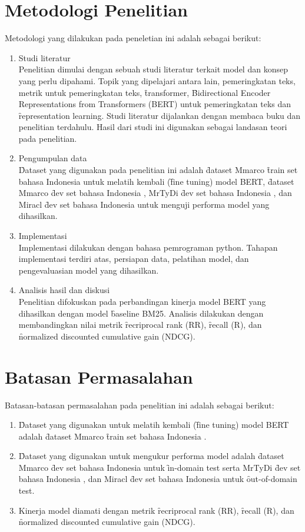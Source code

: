 \section{Metodologi Penelitian}
Metodologi yang dilakukan pada peneletian ini adalah sebagai berikut:
\begin{enumerate}
	\item Studi literatur \\
	Penelitian dimulai dengan sebuah studi literatur terkait model dan konsep yang perlu dipahami. Topik yang dipelajari antara lain, pemeringkatan teks, metrik untuk pemeringkatan teks, \f{transformer}, \f{Bidirectional Encoder Representations from Transformers} (BERT) untuk pemeringkatan teks dan \f{representation learning}. Studi literatur dijalankan dengan membaca buku dan penelitian terdahulu. Hasil dari studi ini digunakan sebagai landasan teori pada penelitian.
	\item Pengumpulan data \\
	\f{Dataset} yang digunakan pada penelitian ini adalah \f{dataset} Mmarco \f{train set} bahasa Indonesia \citep{mmarco} untuk melatih kembali (\f{fine tuning}) model BERT, \f{dataset} Mmarco \f{dev set} bahasa Indonesia \citep{mmarco}, MrTyDi \f{dev set} bahasa Indonesia \citep{mrtydi}, dan Miracl \f{dev set} bahasa Indonesia \citep{miracl} untuk menguji performa model yang dihasilkan.
	\item Implementasi \\
	Implementasi dilakukan dengan bahasa pemrograman python. Tahapan implementasi terdiri atas, persiapan data, pelatihan model, dan pengevaluasian model yang dihasilkan.
	\item Analisis hasil dan diskusi \\
	Penelitian difokuskan pada perbandingan kinerja model BERT yang dihasilkan dengan model \f{baseline} BM25. Analisis dilakukan dengan membandingkan nilai metrik \f{recriprocal rank} (RR), \f{recall} (R), dan \f{normalized discounted cumulative gain} (NDCG).
\end{enumerate}

\section{Batasan Permasalahan}
Batasan-batasan permasalahan pada penelitian ini adalah sebagai berikut:
\begin{enumerate}
	\item \f{Dataset} yang digunakan untuk melatih kembali (\f{fine tuning}) model BERT adalah \f{dataset} Mmarco \f{train set} bahasa Indonesia \citep{mmarco}.
	\item \f{Dataset} yang digunakan untuk mengukur performa model adalah \f{dataset} Mmarco \f{dev set} bahasa Indonesia \citep{mmarco} untuk \f{in-domain test} serta MrTyDi \f{dev set} bahasa Indonesia \citep{mrtydi}, dan Miracl \f{dev set} bahasa Indonesia \citep{miracl} untuk \f{out-of-domain test}.
	\item Kinerja model diamati dengan metrik \f{recriprocal rank} (RR), \f{recall} (R), dan \f{normalized discounted cumulative gain} (NDCG).
\end{enumerate}
